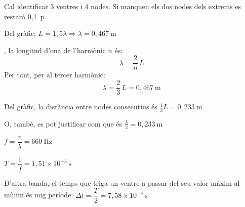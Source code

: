 \begin{solapartat}
\begin{minipage}[t]{0.6\linewidth}
 Cal identificar 3 ventres i 4 nodes. Si manquen els dos nodes dels extrems es restarà 0,1~p.

\medskip
{} Del gràfic: $L = 1,5\lambda \Rightarrow \lambda = 0,467\ \mathrm{m}$
\end{minipage}\hfill
\begin{minipage}[t]{0.36\linewidth}
\vspace{0pt}
\end{minipage}

\medskip
{}, la longitud d'ona de l'harmònic $n$ és:
\[ \lambda = \frac{2}{n}\,L \]
Per tant, per al tercer harmònic:
\[ \lambda = \frac{2}{3}\,L = 0,467\ \mathrm{m} \]

 Del gràfic, la distància entre nodes consecutius és $\frac{1}{3}L = 0,233\ \mathrm{m}$

\smallskip
O, també, es pot justificar com que és $\frac{\lambda}{2} = 0,233\ \mathrm{m}$
\end{solapartat}

\begin{solapartat}
 $f = \dfrac{v}{\lambda} = 660\ \mathrm{Hz}$

\smallskip
{} $T = \dfrac{1}{f} = 1,51\times 10^{-3}\ \mathrm{s}$

\smallskip
{} D'altra banda, el temps que triga un ventre a passar del seu valor màxim al mínim és mig període: $\Delta t = \dfrac{T}{2} = 7,58\times 10^{-4}\ \mathrm{s}$
\end{solapartat}
